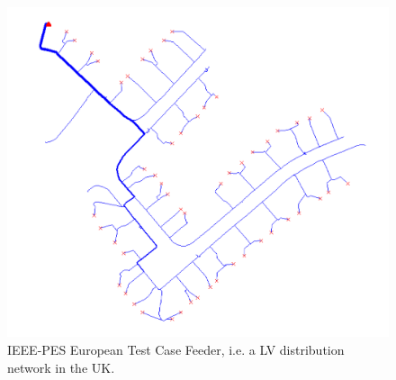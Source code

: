 \begin{figure}\centering
	\includegraphics{_chapter1/fig/network-plot-LVTestCase}
	\caption{IEEE-PES European Test Case Feeder, i.e. a LV distribution network in the UK.}
	\label{ch1:fig:network-plot-LVTestCase}
\end{figure}